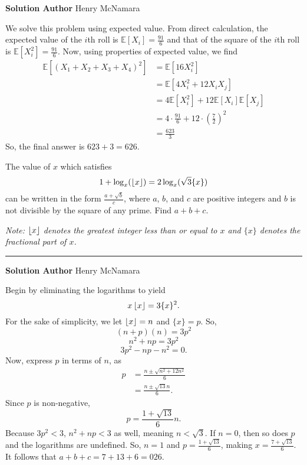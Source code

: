 \documentclass[11pt]{scrartcl}
\newcommand*{\problemfont}{\sffamily\bfseries}
\begin{document}
\pagebreak

{\problemfont Solution Author} Henry McNamara

We solve this problem using expected value. From direct calculation, the expected value of the $i$th roll is $\mathbb{E}[X_{i}] = \frac{91}{6}$ and that of the square of the $i$th roll is $\mathbb{E}[X_{i}^{2}] = \frac{91}{6}$. Now, using properties of expected value, we find
\begin{align*}
    \mathbb{E}[(X_{1} + X_{2} + X_{3} + X_{4})^{2}] &= \mathbb{E}[16X_{i}^{2}] \\
    &= \mathbb{E}[4X_{i}^{2} + 12X_{i}X_{j}] \\
    &= 4\mathbb{E}[{X_{i}^{2}}] + 12\mathbb{E}[X_{i}]\mathbb{E}[X_{j}] \\
    &= 4 \cdot \frac{91}{6} + 12 \cdot \left(\frac{7}{2}\right)^{2} \\
    &= \frac{623}{3}
\end{align*}
So, the final answer is $623 + 3 = \boxed{626}$.

\pagebreak

\begin{problem}
    The value of $x$ which satisfies
    \[1 + \log_{x}(\left\lfloor x \right\rfloor) = 2\log_{x}(\sqrt{3}\{x\})\]
    can be written in the form $\frac{a + \sqrt{b}}{c}$, where $a$, $b$, and $c$ are positive integers and $b$ is not divisible by the square of any prime. Find $a + b + c$.
    
    \emph{Note: $\left\lfloor x \right\rfloor$ denotes the greatest integer less than or equal to $x$ and $\{x\}$ denotes the fractional part of $x$.}    
\end{problem}

\vspace{-\baselineskip}\rule{\textwidth}{0.4pt}

{\problemfont Solution Author} Henry McNamara

Begin by eliminating the logarithms to yield
\[x\left\lfloor x \right\rfloor = 3\{x\}^{2}.\]
For the sake of simplicity, we let $\left\lfloor x \right\rfloor = n$ and $\{x\} = p$. So,
\[(n + p)(n) = 3p^{2}\]
\[n^{2} + np = 3p^{2}\]
\[3p^{2} - np - n^{2} = 0.\]
Now, express $p$ in terms of $n$, as
\begin{align*}
    p &= \frac{n \pm \sqrt{n^{2} + 12n^{2}}}{6} \\
    &= \frac{n \pm \sqrt{13}n}{6}.
\end{align*}
Since $p$ is non-negative,
\[p = \frac{1 + \sqrt{13}}{6}n.\]
Because $3p^{2} < 3$, $n^{2} + np < 3$ as well, meaning $n < \sqrt{3}$. If $n = 0$, then so does $p$ and the logarithms are undefined. So, $n = 1$ and $p = \frac{1 + \sqrt{13}}{6}$, making $x = \frac{7 + \sqrt{13}}{6}$. It follows that $a + b + c = 7 + 13 + 6 = \boxed{026}$.
\end{document}
